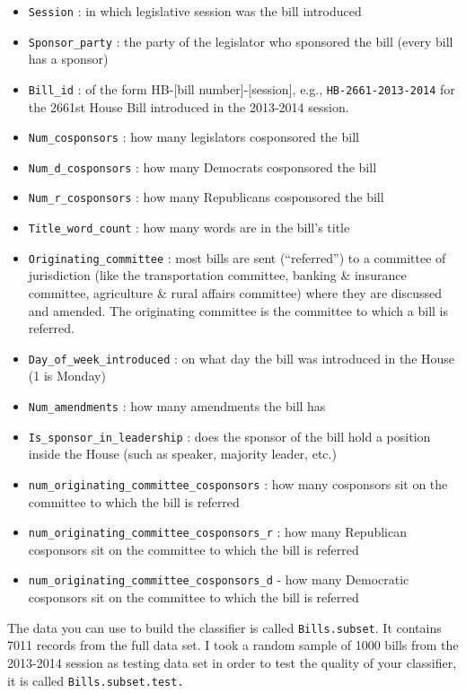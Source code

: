 \documentclass[]{article}
\providecommand{\tightlist}{%
  \setlength{\itemsep}{0pt}\setlength{\parskip}{0pt}}
\begin{document}
\begin{itemize}
\tightlist
\item
  \texttt{Session} : in which legislative session was the bill
  introduced
\item
  \texttt{Sponsor\_party} : the party of the legislator who sponsored
  the bill (every bill has a sponsor)
\item
  \texttt{Bill\_id} : of the form HB-{[}bill number{]}-{[}session{]},
  e.g., \texttt{HB-2661-2013-2014} for the 2661st House Bill introduced
  in the 2013-2014 session.
\item
  \texttt{Num\_cosponsors} : how many legislators cosponsored the bill
\item
  \texttt{Num\_d\_cosponsors} : how many Democrats cosponsored the bill
\item
  \texttt{Num\_r\_cosponsors} : how many Republicans cosponsored the
  bill
\item
  \texttt{Title\_word\_count} : how many words are in the bill's title
\item
  \texttt{Originating\_committee} : most bills are sent (``referred'')
  to a committee of jurisdiction (like the transportation committee,
  banking \& insurance committee, agriculture \& rural affairs
  committee) where they are discussed and amended. The originating
  committee is the committee to which a bill is referred.
\item
  \texttt{Day\_of\_week\_introduced} : on what day the bill was
  introduced in the House (1 is Monday)
\item
  \texttt{Num\_amendments} : how many amendments the bill has
\item
  \texttt{Is\_sponsor\_in\_leadership} : does the sponsor of the bill
  hold a position inside the House (such as speaker, majority leader,
  etc.)
\item
  \texttt{num\_originating\_committee\_cosponsors} : how many cosponsors
  sit on the committee to which the bill is referred
\item
  \texttt{num\_originating\_committee\_cosponsors\_r} : how many
  Republican cosponsors sit on the committee to which the bill is
  referred
\item
  \texttt{num\_originating\_committee\_cosponsors\_d} - how many
  Democratic cosponsors sit on the committee to which the bill is
  referred
\end{itemize}

The data you can use to build the classifier is called
\texttt{Bills.subset}. It contains 7011 records from the full data set.
I took a random sample of 1000 bills from the 2013-2014 session as
testing data set in order to test the quality of your classifier, it is
called \texttt{Bills.subset.test.}
\end{document}
